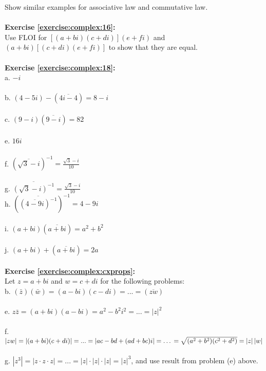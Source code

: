 Show similar examples for associative law and commutative law.\\
\\
\textbf{Exercise \ref{exercise:complex:16}:}\\
Use FLOI for $[(a+bi)(c+di)](e+fi)$ and $(a+bi)[(c+di)(e+fi)]$ to show that they are equal.\\
\\
\textbf{Exercise \ref{exercise:complex:18}:}\\
a. $-i$\\
\\
b. $ (4-5i)-(\overline{4i-4})=8-i$\\
\\
c. $(9-i)(\overline{9-i})=82$\\
\\
e. $16i$\\
\\
f. $(\overline{\sqrt{3}-i})^{-1}=\displaystyle\frac{\sqrt{3}-i}{10}$\\
\\
g. $\overline{(\sqrt{3}-i)^{-1}}=\displaystyle\frac{\sqrt{3}-i}{10}$\newline
\\
h. $(\overline{(\overline{4-9i})^{-1}})^{-1}=4-9i$\\
\\
i. $(a+bi)(\overline{a+bi})=a^{2}+b^{2}$\\
\\
j. $(a+bi)+(\overline{a+bi})=2a$\\
\\
\textbf{Exercise \ref{exercise:complex:cxprops}:}\\
Let $z=a+bi$ and $w=c+di$ for the following problems:\\
b. $(\bar{z})(\bar{w})=(a-bi)(c-di)=...=(\overline{zw})$\\
\\
e. $z \bar{z}=(a+bi)(a-bi)=a^{2}-b^{2}i^{2}=...=\left|z\right|^{2}$\\
\\
f. $\left|zw\right|=\left|(a+bi)(c+di)\right|=...=\left|ac-bd+(ad+bc)i\right|= \ldots \\
=\sqrt{(a^{2}+b^{2})(c^{2}+d^{2})}=\left|z\right|\left|w\right|$\\
\\
g. $\left|z^{3}\right|=\left|z\cdot z \cdot z\right|=...=\left|z\right|\cdot\left|z\right|\cdot\left|z\right|=\left|z\right|^{3}$, and use result from problem (e) above.\\
\\
